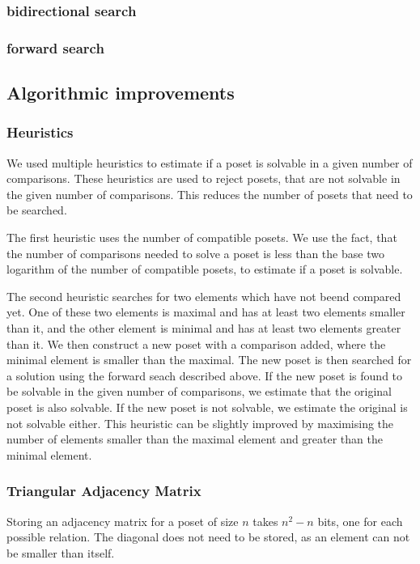 \documentclass[10pt,journal,compsoc]{IEEEtran}
\begin{document}
\subsubsection{bidirectional search}
\subsubsection{forward search}

\subsection{Algorithmic improvements}

\subsubsection{Heuristics}

We used multiple heuristics to estimate if a poset is solvable in a given number of comparisons.
These heuristics are used to reject posets, that are not solvable in the given number of comparisons.
This reduces the number of posets that need to be searched.

The first heuristic uses the number of compatible posets.
We use the fact, that the number of comparisons needed to solve a poset is less than the base two logarithm of the number of compatible posets,
to estimate if a poset is solvable.

The second heuristic searches for two elements which have not beend compared yet.
One of these two elements is maximal and has at least two elements smaller than it,
and the other element is minimal and has at least two elements greater than it.
We then construct a new poset with a comparison added, where the minimal element is smaller than the maximal.
The new poset is then searched for a solution using the forward seach described above.
If the new poset is found to be solvable in the given number of comparisons, we estimate that the original poset is also solvable.
If the new poset is not solvable, we estimate the original is not solvable either.
This heuristic can be slightly improved by maximising the number of elements smaller than the maximal element and greater than the minimal element.

\subsubsection{Triangular Adjacency Matrix}
Storing an adjacency matrix for a poset of size $n$ takes $n^2 - n$ bits, one for each possible relation.
The diagonal does not need to be stored, as an element can not be smaller than itself.
\end{document}
